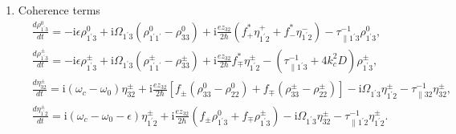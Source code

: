 \documentclass[10pt,letterpaper]{article}%
\begin{document}
\begin{enumerate}
	\item {Coherence terms%
		\begin{subequations}%
			\label{eq:coherencesdm}
			\begin{align}
			&  \frac{d\rho_{1^{\prime}3}^{0}}{dt}=-\mathrm{i}\epsilon\rho_{1^{\prime}%
				3}^{0}+\mathrm{i}\Omega_{1^{\prime}3}\left(  \rho_{1^{\prime}1^{\prime}}%
			^{0}-\rho_{33}^{0}\right)  +\mathrm{i}\frac{ez_{32}}{2\hbar}\left(
			f_{+}^{\ast}\eta_{1^{\prime}2}^{+}+f_{-}^{\ast}\eta_{1^{\prime}2}^{-}\right)
			-\tau_{\parallel1^{\prime}3}^{-1}\rho_{1^{\prime}3}^{0},\\
			&  \frac{d\rho_{1^{\prime}3}^{\pm}}{dt}=-\mathrm{i}\epsilon\rho_{1^{\prime}%
				3}^{\pm}+\mathrm{i}\Omega_{1^{\prime}3}\left(  \rho_{1^{\prime}1^{\prime}%
			}^{\pm}-\rho_{33}^{\pm}\right)  +\mathrm{i}\frac{ez_{32}}{2\hbar}f_{\mp}%
			^{\ast}\eta_{1^{\prime}2}^{\pm}-\left(  \tau_{\parallel1^{\prime}3}%
			^{-1}+4k_{c}^{2}D\right)  \rho_{1^{\prime}3}^{\pm},\label{eq:rho13grating}\\
			&  \frac{d\eta_{32}^{\pm}}{dt}=\mathrm{i}\left(  \omega_{c}-\omega_{0}\right)
			\eta_{32}^{\pm}+\mathrm{i}\frac{ez_{32}}{2\hbar}\left[  f_{\pm}(\rho_{33}%
			^{0}-\rho_{22}^{0})+f_{\mp}(\rho_{33}^{\pm}-\rho_{22}^{\pm})\right]
			-\mathrm{i}\Omega_{1^{\prime}3}\eta_{1^{\prime}2}^{\pm}-\tau_{\parallel
				32}^{-1}\eta_{32}^{\pm},\\
			&  \frac{d\eta_{1^{\prime}2}^{\pm}}{dt}=\mathrm{i}\left(  \omega_{c}%
			-\omega_{0}-\epsilon\right)  \eta_{1^{\prime}2}^{\pm}+\mathrm{i}\frac{ez_{32}%
			}{2\hbar}\left(  f_{\pm}\rho_{1^{\prime}3}^{0}+f_{\mp}\rho_{1^{\prime}3}^{\pm
		}\right)  -\mathrm{i}\Omega_{1^{\prime}3}\eta_{32}^{\pm}-\tau_{\parallel
		1^{\prime}2}^{-1}\eta_{1^{\prime}2}^{\pm}. \label{eq:rho12-dm}%
	\end{align}%
\end{subequations}%
}
\end{enumerate}
\end{document}

